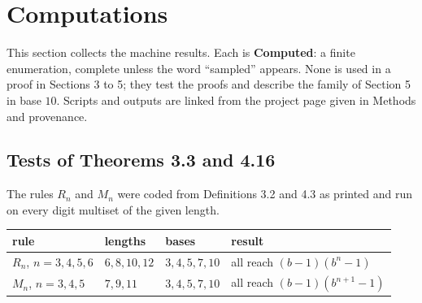 \documentclass[11pt,letterpaper]{article}
\theoremstyle{paperstyle}
\theoremstyle{paperstyledef}
\theoremstyle{paperstylerem}
\begin{document}
\section{Computations}\label{computations}

This section collects the machine results. Each is \textbf{Computed}: a finite enumeration, complete unless the word ``sampled'' appears. None is used in a proof in Sections 3 to 5; they test the proofs and describe the family of Section 5 in base \(10\). Scripts and outputs are linked from the project page given in Methods and provenance.

\subsection{Tests of Theorems 3.3 and 4.16}\label{tests-of-theorems-3.3-and-4.16}

The rules \(R_n\) and \(M_n\) were coded from Definitions 3.2 and 4.3 as printed and run on every digit multiset of the given length.

{\def\LTcaptype{none} %
\begin{longtable}[]{@{}
  >{\raggedright\arraybackslash}p{}
  >{\raggedright\arraybackslash}p{}
  >{\raggedright\arraybackslash}p{}
  >{\raggedright\arraybackslash}p{}@{}}
\toprule\noalign{}
\begin{minipage}[b]{\linewidth}\raggedright
rule
\end{minipage} & \begin{minipage}[b]{\linewidth}\raggedright
lengths
\end{minipage} & \begin{minipage}[b]{\linewidth}\raggedright
bases
\end{minipage} & \begin{minipage}[b]{\linewidth}\raggedright
result
\end{minipage} \\
\midrule\noalign{}
\endhead
\bottomrule\noalign{}
\endlastfoot
\(R_n\), \(n = 3, 4, 5, 6\) & \(6, 8, 10, 12\) & \(3, 4, 5, 7, 10\) & all reach \((b-1)(b^n-1)\) \\
\(M_n\), \(n = 3, 4, 5\) & \(7, 9, 11\) & \(3, 4, 5, 7, 10\) & all reach \((b-1)(b^{n+1}-1)\) \\
\end{longtable}
}
\end{document}
